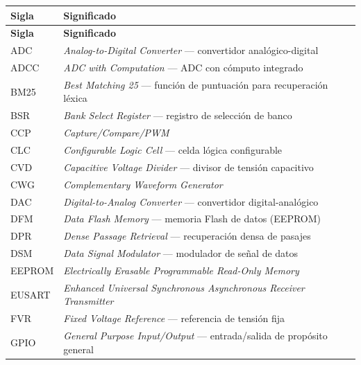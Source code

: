 

\begin{longtable}{@{}p{}p{}@{}}
\toprule
\textbf{Sigla} & \textbf{Significado} \\
\midrule
\endfirsthead
\toprule
\textbf{Sigla} & \textbf{Significado} \\
\midrule
\endhead
\bottomrule
\endfoot

ADC     & \textit{Analog-to-Digital Converter} — convertidor analógico-digital \\
ADCC    & \textit{ADC with Computation} — ADC con cómputo integrado \\
BM25    & \textit{Best Matching 25} — función de puntuación para recuperación léxica \\
BSR     & \textit{Bank Select Register} — registro de selección de banco \\
CCP     & \textit{Capture/Compare/PWM} \\
CLC     & \textit{Configurable Logic Cell} — celda lógica configurable \\
CVD     & \textit{Capacitive Voltage Divider} — divisor de tensión capacitivo \\
CWG     & \textit{Complementary Waveform Generator} \\
DAC     & \textit{Digital-to-Analog Converter} — convertidor digital-analógico \\
DFM     & \textit{Data Flash Memory} — memoria Flash de datos (EEPROM) \\
DPR     & \textit{Dense Passage Retrieval} — recuperación densa de pasajes \\
DSM     & \textit{Data Signal Modulator} — modulador de señal de datos \\
EEPROM  & \textit{Electrically Erasable Programmable Read-Only Memory} \\
EUSART  & \textit{Enhanced Universal Synchronous Asynchronous Receiver Transmitter} \\
FVR     & \textit{Fixed Voltage Reference} — referencia de tensión fija \\
GPIO    & \textit{General Purpose Input/Output} — entrada/salida de propósito general \\

\end{longtable}
